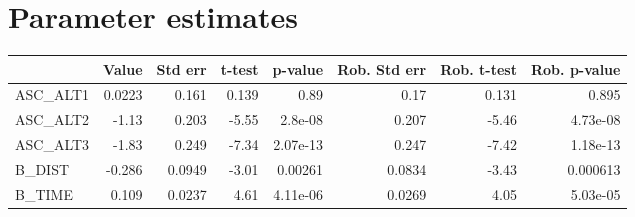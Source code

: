 \section{Parameter estimates}
\begin{tabular}{lrrrrrrr}
\toprule
{} &  Value &  Std err &  t-test &  p-value &  Rob. Std err &  Rob. t-test &  Rob. p-value \\
\midrule
ASC\_ALT1 & 0.0223 &    0.161 &   0.139 &     0.89 &          0.17 &        0.131 &         0.895 \\
ASC\_ALT2 &  -1.13 &    0.203 &   -5.55 &  2.8e-08 &         0.207 &        -5.46 &      4.73e-08 \\
ASC\_ALT3 &  -1.83 &    0.249 &   -7.34 & 2.07e-13 &         0.247 &        -7.42 &      1.18e-13 \\
B\_DIST   & -0.286 &   0.0949 &   -3.01 &  0.00261 &        0.0834 &        -3.43 &      0.000613 \\
B\_TIME   &  0.109 &   0.0237 &    4.61 & 4.11e-06 &        0.0269 &         4.05 &      5.03e-05 \\
\bottomrule
\end{tabular}

